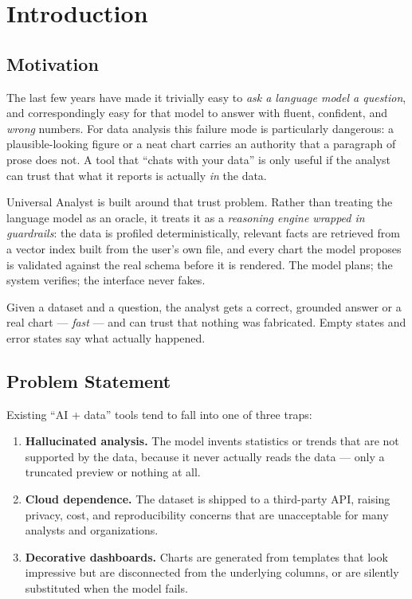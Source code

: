 \chapter{Introduction}
\label{ch:intro}

\section{Motivation}
The last few years have made it trivially easy to \emph{ask a language model a
question}, and correspondingly easy for that model to answer with fluent,
confident, and \emph{wrong} numbers. For data analysis this failure mode is
particularly dangerous: a plausible-looking figure or a neat chart carries an
authority that a paragraph of prose does not. A tool that ``chats with your
data'' is only useful if the analyst can trust that what it reports is actually
\emph{in} the data.

Universal Analyst is built around that trust problem. Rather than treating the
language model as an oracle, it treats it as a \emph{reasoning engine wrapped in
guardrails}: the data is profiled deterministically, relevant facts are
retrieved from a vector index built from the user's own file, and every chart
the model proposes is validated against the real schema before it is rendered.
The model plans; the system verifies; the interface never fakes.

\begin{uanote}
Given a dataset and a question, the analyst gets a correct, grounded answer or a
real chart --- \emph{fast} --- and can trust that nothing was fabricated. Empty
states and error states say what actually happened.
\end{uanote}

\section{Problem Statement}
Existing ``AI + data'' tools tend to fall into one of three traps:

\begin{enumerate}
  \item \textbf{Hallucinated analysis.} The model invents statistics or trends
        that are not supported by the data, because it never actually reads the
        data --- only a truncated preview or nothing at all.
  \item \textbf{Cloud dependence.} The dataset is shipped to a third-party API,
        raising privacy, cost, and reproducibility concerns that are
        unacceptable for many analysts and organizations.
  \item \textbf{Decorative dashboards.} Charts are generated from templates that
        look impressive but are disconnected from the underlying columns, or are
        silently substituted when the model fails.
\end{enumerate}

